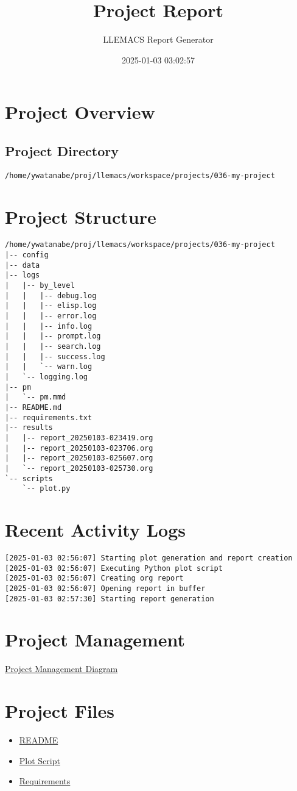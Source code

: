 \documentclass[11pt]{article}
\author{LLEMACS Report Generator}
\date{2025-01-03 03:02:57}
\title{Project Report}
\begin{document}
\maketitle
\tableofcontents


\section{Project Overview}
\label{sec:orgc9b984f}
\subsection{Project Directory}
\label{sec:orga3cec64}
\texttt{/home/ywatanabe/proj/llemacs/workspace/projects/036-my-project}

\section{Project Structure}
\label{sec:org011d779}
\begin{verbatim}
/home/ywatanabe/proj/llemacs/workspace/projects/036-my-project
|-- config
|-- data
|-- logs
|   |-- by_level
|   |   |-- debug.log
|   |   |-- elisp.log
|   |   |-- error.log
|   |   |-- info.log
|   |   |-- prompt.log
|   |   |-- search.log
|   |   |-- success.log
|   |   `-- warn.log
|   `-- logging.log
|-- pm
|   `-- pm.mmd
|-- README.md
|-- requirements.txt
|-- results
|   |-- report_20250103-023419.org
|   |-- report_20250103-023706.org
|   |-- report_20250103-025607.org
|   `-- report_20250103-025730.org
`-- scripts
    `-- plot.py
\end{verbatim}

\section{Recent Activity Logs}
\label{sec:org987d76e}
\begin{verbatim}
[2025-01-03 02:56:07] Starting plot generation and report creation
[2025-01-03 02:56:07] Executing Python plot script
[2025-01-03 02:56:07] Creating org report
[2025-01-03 02:56:07] Opening report in buffer
[2025-01-03 02:57:30] Starting report generation
\end{verbatim}

\section{Project Management}
\label{sec:org97054bf}
\href{../pm/pm.mmd}{Project Management Diagram}

\section{Project Files}
\label{sec:org1358b42}
\begin{itemize}
\item \href{../README.md}{README}
\item \href{../scripts/plot.py}{Plot Script}
\item \href{../requirements.txt}{Requirements}
\end{itemize}
\end{document}
